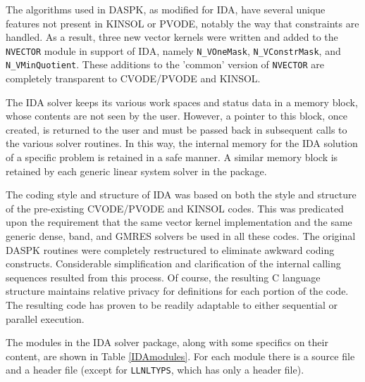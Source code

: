 The algorithms used in DASPK, as modified for IDA, have several unique
features not present in KINSOL or PVODE, notably the way that
constraints are handled.  As a result, three new vector kernels were
written and added to the {\tt NVECTOR} module in support of IDA,
namely {\tt N\_VOneMask}, {\tt N\_VConstrMask}, and {\tt N\_VMinQuotient}. 
These additions to the 'common' version of {\tt NVECTOR} are
completely transparent to CVODE/PVODE and KINSOL.

The IDA solver keeps its various work spaces and status data in a
memory block, whose contents are not seen by the user.  However, a
pointer to this block, once created, is returned to the user and must
be passed back in subsequent calls to the various solver routines.  In
this way, the internal memory for the IDA solution of a specific
problem is retained in a safe manner.  A similar memory block is
retained by each generic linear system solver in the package.

The coding style and structure of IDA was based on both the style and
structure of the pre-existing CVODE/PVODE and KINSOL codes. This was
predicated upon the requirement that the same vector kernel
implementation and the same generic dense, band, and GMRES solvers be
used in all these codes.  The original DASPK routines were completely
restructured to eliminate awkward coding constructs.  Considerable
simplification and clarification of the internal calling sequences
resulted from this process.  Of course, the resulting C language
structure maintains relative privacy for definitions for each portion
of the code.  The resulting code has proven to be readily adaptable to
either sequential or parallel execution.

The modules in the IDA solver package, along with some specifics on
their content, are shown in Table \ref{IDAmodules}.  For each module
there is a source file and a header file (except for {\tt LLNLTYPS},
which has only a header file).

